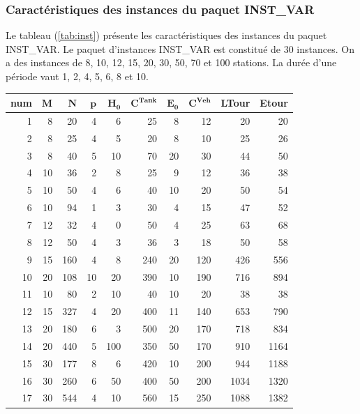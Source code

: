 {\subsubsection{Caractéristiques des instances du paquet INST\_VAR}
Le tableau (\ref{tab:inst}) présente les caractéristiques des instances du paquet INST\_VAR.
Le paquet d'instances INST\_VAR est constitué de 30 instances. On a des instances de 8, 10, 12, 15, 20, 30, 50, 70 et 100 stations. La durée d'une période vaut 1, 2, 4, 5, 6, 8 et 10.
\begin{table}[H]
	\centering
	\small{
		\begin{tabular}{|r|r|r|r|r|r|r|r|r|r|}
			\hline
			\toprule
			\rowcolor{cyan}	\textbf{num} &$\mathbf{M}$ & $\mathbf{N}$ & $\mathbf{p}$ &  $\mathbf{H_0} $ & $\mathbf{C^{Tank}}$ & $\mathbf{E_0}$ & $\mathbf{C^{Veh}}$ & \textbf{LTour} & \textbf{Etour} \\
			\midrule
			\hline
			1	&	8	&	20	&	4	&	6	&	25	&	8	&	12	&	20	&	20	\\ \hline
			2	&	8	&	25	&	4	&	5	&	20	&	8	&	10	&	25	&	26	\\ \hline
			3	&	8	&	40	&	5	&	10	&	70	&	20	&	30	&	44	&	50	\\ \hline
			4	&	10	&	36	&	2	&	8	&	25	&	9	&	12	&	36	&	38	\\ \hline
			5	&	10	&	50	&	4	&	6	&	40	&	10	&	20	&	50	&	54	\\ \hline
			6	&	10	&	94	&	1	&	3	&	30	&	4	&	15	&	47	&	52	\\ \hline
			7	&	12	&	32	&	4	&	0	&	50	&	4	&	25	&	63	&	68	\\ \hline
			8	&	12	&	50	&	4	&	3	&	36	&	3	&	18	&	50	&	58	\\ \hline
			9	&	15	&	160	&	4	&	8	&	240	&	20	&	120	&	426	&	556	\\ \hline
			10	&	20	&	108	&	10	&	20	&	390	&	10	&	190	&	716	&	894	\\ \hline
			11	&	10	&	80	&	2	&	10	&	40	&	10	&	20	&	38	&	38	\\ \hline
			12	&	15	&	327	&	4	&	20	&	400	&	11	&	140	&	653	&	790	\\ \hline
			13	&	20	&	180	&	6	&	3	&	500	&	20	&	170	&	718	&	834	\\ \hline
			14	&	20	&	440	&	5	&	100	&	350	&	50	&	170	&	910	&	1164	\\ \hline
			15	&	30	&	177	&	8	&	6	&	420	&	10	&	200	&	944	&	1188	\\ \hline
			16	&	30	&	260	&	6	&	50	&	400	&	50	&	200	&	1034	&	1320	\\ \hline
			17	&	30	&	544	&	4	&	10	&	560	&	15	&	250	&	1088	&	1382	\\ \hline

\end{tabular}}
\end{table}}
